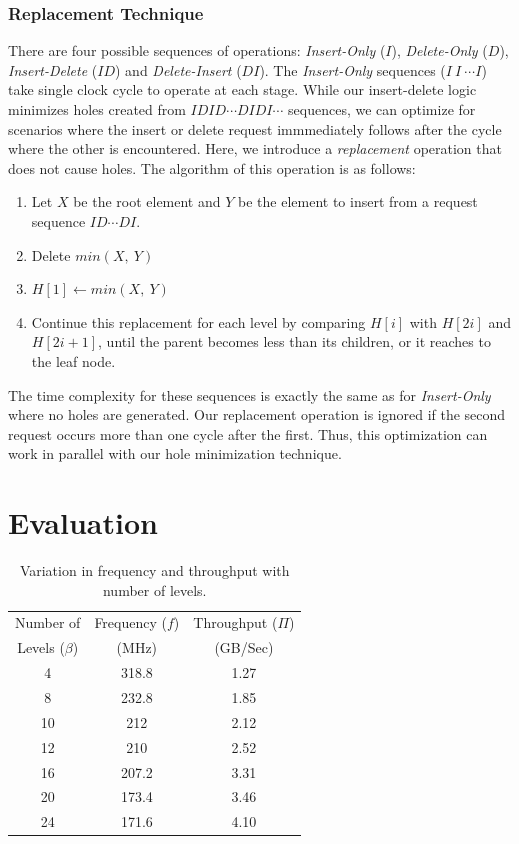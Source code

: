 \documentclass[10pt, conference, compsocconf]{IEEEtran}
\begin{document}
\subsubsection{Replacement Technique}
 There are four possible sequences of operations: {\it Insert-Only} ($I$), {\it Delete-Only} ($D$), {\it Insert-Delete} ($ID$) and {\it Delete-Insert} ($DI$).
The {\it Insert-Only} sequences ($I \ I \ \cdots I $) take single clock cycle to operate at each stage.
While our insert-delete logic minimizes holes created from $IDID \cdots DIDI \cdots$ sequences, we can optimize for scenarios where the insert or delete request immmediately follows after the cycle where the other is encountered.
Here, we introduce a {\it replacement} operation that does not cause holes.
The algorithm of this operation is as follows:
 \begin{enumerate}
 \item Let $X$ be the root element and $Y$ be the element to insert from a request sequence $ID \cdots DI$.
 \item Delete $min(X, \ Y)$
 \item $H[1] \leftarrow min(X,\ Y)$
 \item Continue this replacement for each level by comparing $H[i]$ with $H[2i]$ and $H[2i+1]$, until the parent becomes less than its children, or it reaches to the leaf node.
 \end{enumerate}
The time complexity for these sequences is exactly the same as for {\it Insert-Only} where no holes are generated.
Our replacement operation is ignored if the second request occurs more than one cycle after the first.
Thus, this optimization can work in parallel with our hole minimization technique.


\section{Evaluation}

\begin{table}[!ht]
 \begin{center}
 \caption{Variation in frequency and throughput with number of levels.}
\label{table1}
\begin{tabular}{ |c|c|c| }
 \hline
 Number of & Frequency ($f$) & Throughput ($\Pi$) \\
 Levels ($\beta$) & (MHz)& (GB/Sec)\\
 \hline
 \hline
 4 & 318.8 &  1.27\\
 8 & 232.8 &  1.85\\
 10 & 212 &  2.12 \\
 12 & 210 &  2.52 \\
 16 & 207.2 &  3.31\\
 20 & 173.4 &  3.46 \\
 24 & 171.6 &  4.10\\
 \hline
\end{tabular}
\end{center}
\end{table}
\end{document}
